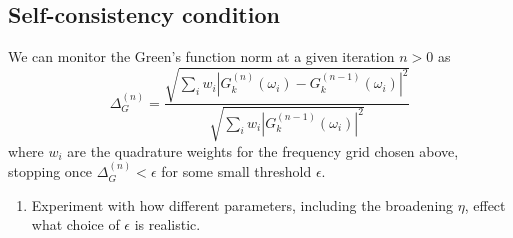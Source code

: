 \subsection{Self-consistency condition}
We can monitor the Green's function norm at a given iteration $n>0$ as
\begin{equation}
    \Delta_G^{(n)} = \frac{\sqrt{\sum_i w_i |G_{k}^{(n)}(\omega_i) - G_{k}^{(n-1)}(\omega_i)|^2}}{\sqrt{\sum_i w_i |G_{k}^{(n-1)}(\omega_i)|^2}}
\end{equation}
where $w_i$ are the quadrature weights for the frequency grid chosen above, stopping once $\Delta_G^{(n)} < \epsilon$ for some small threshold $\epsilon$.
\begin{enumerate}
    \item Experiment with how different parameters, including the broadening $\eta$, effect what choice of $\epsilon$ is realistic.
\end{enumerate}
